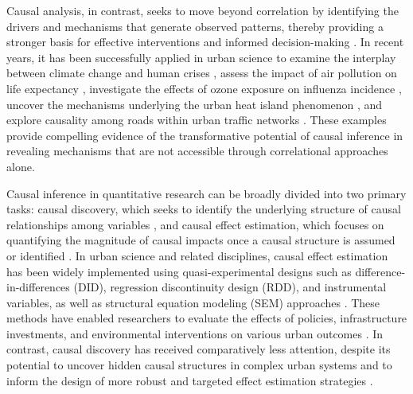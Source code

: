 \documentclass[authoryear,preprint,review,12pt]{elsarticle}
\begin{document}
Causal analysis, in contrast, seeks to move beyond correlation by identifying the drivers and mechanisms that generate observed patterns, thereby providing a stronger basis for effective interventions and informed decision-making \citep{niu2023mobility_intervention_policies,li2025city_carbon,fekete2025urban_transport}. In recent years, it has been successfully applied in urban science to examine the interplay between climate change and human crises \citep{zhang2011climate_change_human_crisis}, assess the impact of air pollution on life expectancy \citep{chen2013air_pollution_life_expectancy}, investigate the effects of ozone exposure on influenza incidence \citep{guo2024ozone_influenza}, uncover the mechanisms underlying the urban heat island phenomenon \citep{zhong2024urban_heat_island}, and explore causality among roads within urban traffic networks \citep{mao2024urban_traffic_networks}. These examples provide compelling evidence of the transformative potential of causal inference in revealing mechanisms that are not accessible through correlational approaches alone.

Causal inference in quantitative research can be broadly divided into two primary tasks: causal discovery, which seeks to identify the underlying structure of causal relationships among variables \citep{runge2015causal_gateways,runge2019ictsess,runge2023cits}, and causal effect estimation, which focuses on quantifying the magnitude of causal impacts once a causal structure is assumed or identified \citep{pearl1995scm1,pearl2000scm2,rubin1974pom1,rubin1986pom2}. In urban science and related disciplines, causal effect estimation has been widely implemented using quasi-experimental designs such as difference-in-differences (DID), regression discontinuity design (RDD), and instrumental variables, as well as structural equation modeling (SEM) approaches \citep{liu2021quasi_experimental,delgado2015sdid,kolak2019srdd,bowden2015instruments,rosseel2012sem}. These methods have enabled researchers to evaluate the effects of policies, infrastructure investments, and environmental interventions on various urban outcomes \citep{chen2013air_pollution_life_expectancy,jia2021high_speed_rail,li2024protected_areas}. In contrast, causal discovery has received comparatively less attention, despite its potential to uncover hidden causal structures in complex urban systems and to inform the design of more robust and targeted effect estimation strategies \citep{deng2022urban_granger_causality,fekete2025urban_transport,gan2025urban_transfer_entropy}.
\end{document}
